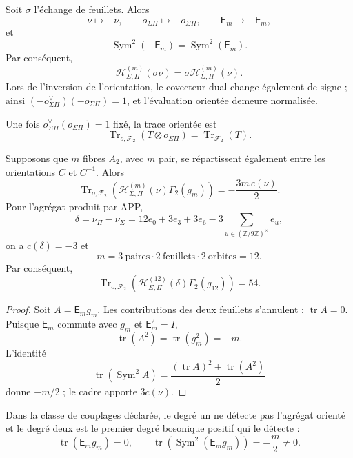 Soit \(\sigma\) l'échange de feuillets. Alors
\[
\nu\longmapsto-\nu,\qquad
o_{\Sigma\Pi}\longmapsto-o_{\Sigma\Pi},\qquad
\mathsf E_m\longmapsto-\mathsf E_m,
\]
et
\[
\operatorname{Sym}^2(-\mathsf E_m)
=\operatorname{Sym}^2(\mathsf E_m).
\]
Par conséquent,
\[
\mathcal H_{\Sigma,\Pi}^{(m)}(\sigma\nu)
=\sigma\mathcal H_{\Sigma,\Pi}^{(m)}(\nu).
\]
Lors de l'inversion de l'orientation, le covecteur dual change également de signe ; ainsi
\((-o_{\Sigma\Pi}^{\vee})(-o_{\Sigma\Pi})=1\), et l'évaluation orientée
demeure normalisée.

Une fois
\(o_{\Sigma\Pi}^{\vee}(o_{\Sigma\Pi})=1\) fixé, la trace orientée est
\[
\operatorname{Tr}_{o,\mathcal F_2}
(T\otimes o_{\Sigma\Pi})
=\operatorname{Tr}_{\mathcal F_2}(T).
\]

\begin{theorem}
\label{p12-83-c20-s7:thm:indice-orientado-app-fock}
Supposons que \(m\) fibres \(A_2\), avec \(m\) pair, se répartissent également
entre les orientations \(C\) et \(C^{-1}\). Alors
\[
\boxed{
\operatorname{Tr}_{o,\mathcal F_2}
\left(
\mathcal H_{\Sigma,\Pi}^{(m)}(\nu)\Gamma_2(g_m)
\right)
=-\frac{3m\,c(\nu)}2.}
\]
Pour l'agrégat produit par APP,
\[
\delta=\nu_\Pi-\nu_\Sigma
=12e_0+3e_3+3e_6
-3\sum_{u\in(\mathbb Z/9\mathbb Z)^\times}e_u,
\]
on a \(c(\delta)=-3\) et
\[
m=3\ \text{paires}\cdot2\ \text{feuillets}\cdot2\ \text{orbites}=12.
\]
Par conséquent,
\[
\boxed{
\operatorname{Tr}_{o,\mathcal F_2}
\left(
\mathcal H_{\Sigma,\Pi}^{(12)}(\delta)\Gamma_2(g_{12})
\right)=54.}
\]
\end{theorem}

\begin{proof}
Soit \(A=\mathsf E_mg_m\). Les contributions des deux feuillets s'annulent :
\(\operatorname{tr}A=0\). Puisque \(\mathsf E_m\) commute avec \(g_m\) et
\(\mathsf E_m^2=I\),
\[
\operatorname{tr}(A^2)=\operatorname{tr}(g_m^2)=-m.
\]
L’identité
\[
\operatorname{tr}(\operatorname{Sym}^2A)
=\frac{(\operatorname{tr}A)^2+\operatorname{tr}(A^2)}2
\]
donne \(-m/2\) ; le cadre apporte \(3c(\nu)\).
\end{proof}

\begin{corollary}
\label{p12-83-c20-s7:cor:minimalidad-grado-dos-app-fock-u030}
Dans la classe de couplages déclarée, le degré un ne détecte pas l'agrégat
orienté et le degré deux est le premier degré bosonique positif qui le
détecte :
\[
 \operatorname{tr}(\mathsf E_mg_m)=0,
 \qquad
 \operatorname{tr}\!\left(
 \operatorname{Sym}^2(\mathsf E_mg_m)
 \right)=-\frac m2\neq0.
\]
\end{corollary}

